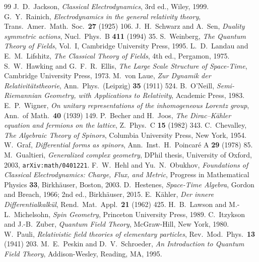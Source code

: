 \begin{thebibliography}{99}
 J.~D.~Jackson, \emph{Classical Electrodynamics}, 3rd ed., Wiley, 1999.
 G.~Y.~Rainich, \emph{Electrodynamics in the general relativity theory}, Trans.~Amer.~Math.~Soc.~\textbf{27} (1925) 106.
 J.~H.~Schwarz and A.~Sen, \emph{Duality symmetric actions}, Nucl.~Phys.~B \textbf{411} (1994) 35.
 S.~Weinberg, \emph{The Quantum Theory of Fields}, Vol.~I, Cambridge University Press, 1995.
 L.~D.~Landau and E.~M.~Lifshitz, \emph{The Classical Theory of Fields}, 4th ed., Pergamon, 1975.
 S.~W.~Hawking and G.~F.~R.~Ellis, \emph{The Large Scale Structure of Space-Time}, Cambridge University Press, 1973.
 M.~von Laue, \emph{Zur Dynamik der Relativit\"atstheorie}, Ann.~Phys.~(Leipzig) \textbf{35} (1911) 524.
 B.~O'Neill, \emph{Semi-Riemannian Geometry, with Applications to Relativity}, Academic Press, 1983.
 E.~P.~Wigner, \emph{On unitary representations of the inhomogeneous Lorentz group}, Ann.~of Math.~\textbf{40} (1939) 149.
 P.~Becher and H.~Joos, \emph{The Dirac--K\"ahler equation and fermions on the lattice}, Z.~Phys.~C \textbf{15} (1982) 343.
 C.~Chevalley, \emph{The Algebraic Theory of Spinors}, Columbia University Press, New York, 1954.
 W.~Graf, \emph{Differential forms as spinors}, Ann.~Inst.~H.~Poincar\'e A \textbf{29} (1978) 85.
 M.~Gualtieri, \emph{Generalized complex geometry}, DPhil thesis, University of Oxford, 2003, \texttt{arXiv:math/0401221}.
 F.~W.~Hehl and Yu.~N.~Obukhov, \emph{Foundations of Classical Electrodynamics: Charge, Flux, and Metric}, Progress in Mathematical Physics \textbf{33}, Birkh\"auser, Boston, 2003.
 D.~Hestenes, \emph{Space-Time Algebra}, Gordon and Breach, 1966; 2nd ed., Birkh\"auser, 2015.
 E.~K\"ahler, \emph{Der innere Differentialkalk\"ul}, Rend.~Mat.~Appl.~\textbf{21} (1962) 425.
 H.~B.~Lawson and M.-L.~Michelsohn, \emph{Spin Geometry}, Princeton University Press, 1989.
 C.~Itzykson and J.-B.~Zuber, \emph{Quantum Field Theory}, McGraw-Hill, New York, 1980.
 W.~Pauli, \emph{Relativistic field theories of elementary particles}, Rev.~Mod.~Phys.~\textbf{13} (1941) 203.
 M.~E.~Peskin and D.~V.~Schroeder, \emph{An Introduction to Quantum Field Theory}, Addison-Wesley, Reading, MA, 1995.
\end{thebibliography}
